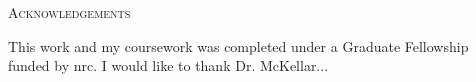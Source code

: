 \begin{center}
   {\LARGE\textsc{Acknowledgements}}

   This work and my coursework was completed under a Graduate Fellowship funded by \acf{nrc}. I would like to thank Dr. McKellar...
\end{center}

